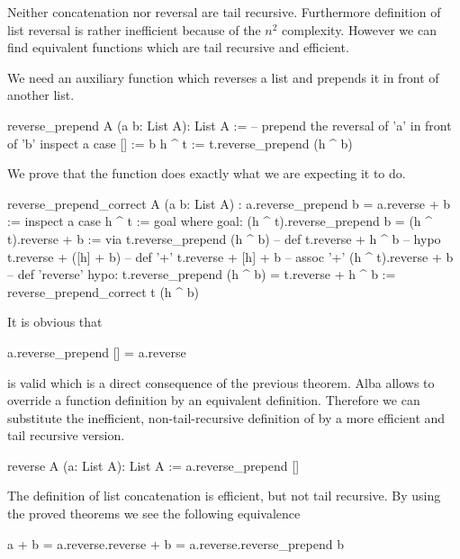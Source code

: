 Neither concatenation nor reversal are tail recursive. Furthermore definition
of list reversal is rather inefficient because of the $n^2$
complexity. However we can find equivalent functions which are tail recursive
and efficient.

We need an auxiliary function which reverses a list and prepends it in front
of another list.

\begin{alba}
  reverse_prepend A (a b: List A): List A :=
      -- prepend the reversal of 'a' in front of 'b'
    inspect
      a
    case
      [] :=
        b
      h ^ t :=
        t.reverse_prepend (h ^ b)
\end{alba}


We prove that the function does exactly what we are expecting it to do.

\begin{alba}
  reverse_prepend_correct
    A (a b: List A)
    : a.reverse_prepend b = a.reverse + b :=
      inspect a case
        h ^ t :=
          goal where
            goal: (h ^ t).reverse_prepend  b = (h ^ t).reverse + b :=
              via
                t.reverse_prepend (h ^ b)            -- def
                t.reverse + h ^ b                    -- hypo
                t.reverse + ([h] + b)                -- def '+'
                t.reverse + [h] + b                  -- assoc '+'
                (h ^ t).reverse + b                  -- def 'reverse'
             hypo: t.reverse_prepend (h ^ b) = t.reverse + h ^ b :=
               reverse_prepend_correct t (h ^ b)
\end{alba}


It is obvious that
%
\begin{alba}
  a.reverse_prepend [] = a.reverse
\end{alba}
%
is valid which is a direct consequence of the previous theorem. Alba allows to
override a function definition by an equivalent definition. Therefore we can
substitute the inefficient, non-tail-recursive definition of  by
a more efficient and tail recursive version.

\begin{alba}
  reverse A (a: List A): List A :=
    a.reverse_prepend []
\end{alba}

The definition of list concatenation is efficient, but not tail recursive. By
using the proved theorems we see the following equivalence
%
\begin{alba}
  a + b   =  a.reverse.reverse + b
          =  a.reverse.reverse_prepend b
\end{alba}

